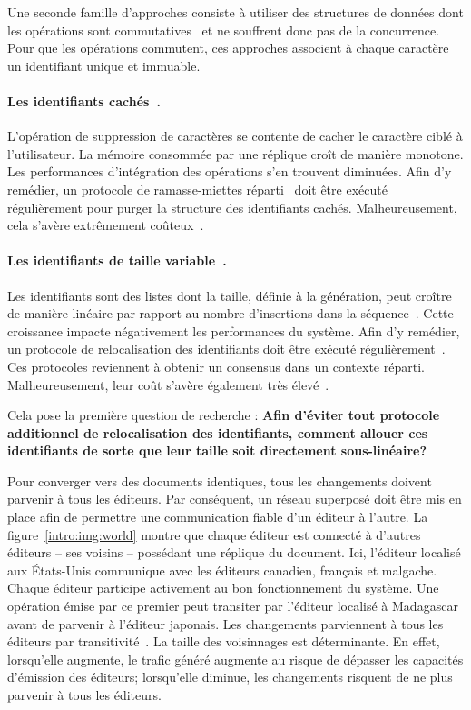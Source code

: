 Une seconde famille d'approches consiste à utiliser des structures de données
dont les opérations sont commutatives~\cite{shapiro2011conflict} et ne souffrent
donc pas de la concurrence. Pour que les opérations commutent, ces approches
associent à chaque caractère un identifiant unique et immuable.

\paragraph{Les identifiants cachés~\cite{oster2006data}.} L'opération de
suppression de caractères se contente de cacher le caractère ciblé à
l'utilisateur. La mémoire consommée par une réplique croît de manière
monotone. Les performances d'intégration des opérations s'en trouvent
diminuées. Afin d'y remédier, un protocole de ramasse-miettes
réparti~\cite{abdullahi1998garbage} doit être exécuté régulièrement pour purger
la structure des identifiants cachés. Malheureusement, cela s'avère extrêmement
coûteux~\cite{abdullahi1998garbage}.

\paragraph{Les identifiants de taille variable~\cite{weiss2009logoot}.} Les
identifiants sont des listes dont la taille, définie à la génération, peut
croître de manière linéaire par rapport au nombre d'insertions dans la
séquence~\cite{weiss2009logoot}. Cette croissance impacte négativement les
performances du système. Afin d'y remédier, un protocole de relocalisation des
identifiants doit être exécuté régulièrement~\cite{zawirskiasynchronous}. Ces
protocoles reviennent à obtenir un consensus dans un contexte
réparti. Malheureusement, leur coût s'avère également très
élevé~\cite{mostefaoui2015signature}.

Cela pose la première question de recherche : \textbf{Afin d'éviter tout
  protocole additionnel de relocalisation des identifiants, comment allouer ces
  identifiants de sorte que leur taille soit directement sous-linéaire?}

Pour converger vers des documents identiques, tous les changements doivent
parvenir à tous les éditeurs. Par conséquent, un réseau superposé doit être mis
en place afin de permettre une communication fiable d'un éditeur à l'autre.  La
figure~\ref{intro:img:world} montre que chaque éditeur est connecté à d'autres
éditeurs -- ses voisins -- possédant une réplique du document. Ici, l'éditeur
localisé aux États-Unis communique avec les éditeurs canadien, français et
malgache. Chaque éditeur participe activement au bon fonctionnement du
système. Une opération émise par ce premier peut transiter par l'éditeur
localisé à Madagascar avant de parvenir à l'éditeur japonais.  Les changements
parviennent à tous les éditeurs par transitivité~\cite{birman1999bimodal}.  La
taille des voisinnages est déterminante. En effet, lorsqu'elle augmente, le
trafic généré augmente au risque de dépasser les capacités d'émission des
éditeurs; lorsqu'elle diminue, les changements risquent de ne plus parvenir à
tous les éditeurs.

